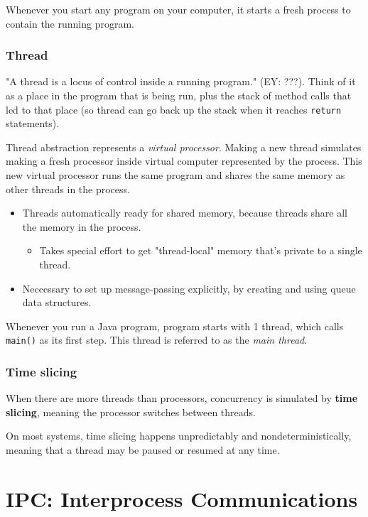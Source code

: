 \documentclass[10pt]{amsart}
\begin{document}
Whenever you start any program on your computer, it starts a fresh process to contain the running program. \\

\subsubsection{Thread}

"A thread is a locus of control inside a running program." (EY: ???). Think of it as a place in the program that is being run, plus the stack of method calls that led to that place (so thread can go back up the stack when it reaches \texttt{return} statements).

Thread abstraction represents a \emph{virtual processor}. Making a new thread simulates making a fresh processor inside virtual computer represented by the process. This new virtual processor runs the same program and shares the same memory as other threads in the process.

\begin{itemize}
	\item Threads automatically ready for shared memory, because threads share all the memory in the process.
	\begin{itemize}
		\item Takes special effort to get "thread-local" memory that's private to a single thread.		
	\end{itemize}
	\item Neccessary to set up message-passing explicitly, by creating and using queue data structures.
\end{itemize}

Whenever you run a Java program, program starts with 1 thread, which calls \verb|main()| as its first step. This thread is referred to as the \emph{main thread}.

\subsubsection{Time slicing}

When there are more threads than processors, concurrency is simulated by \textbf{time slicing}, meaning the processor switches between threads.

On most systems, time slicing happens unpredictably and nondeterministically, meaning that a thread may be paused or resumed at any time.


\section{IPC: Interprocess Communications}
\end{document}
